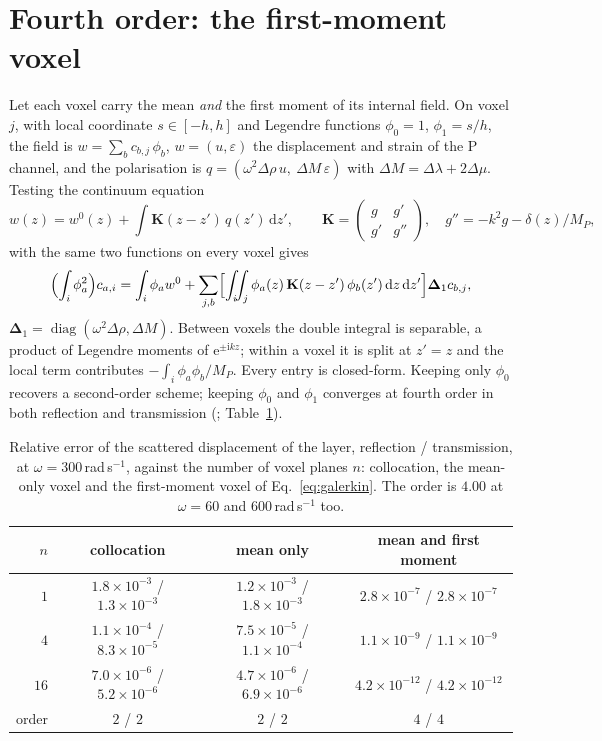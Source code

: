 \documentclass[extra,mreferee]{gji}
\newcommand{\bK}{\mathbf{K}}
\newcommand{\bD}{\boldsymbol{\Delta}}
\begin{document}
\section{Fourth order: the first-moment voxel}\label{sec:fourth}

Let each voxel carry the mean \emph{and} the first moment of its internal field. On voxel $j$, with
local coordinate $s\in[-h,h]$ and Legendre functions $\phi_0=1$, $\phi_1=s/h$, the field is
$w=\sum_{b}c_{b,j}\,\phi_b$, $w=(u,\varepsilon)$ the displacement and strain of the P channel, and
the polarisation is $q=(\omega^2\Delta\rho\,u,\ \Delta M\,\varepsilon)$ with $\Delta M=\Delta\lambda
+2\Delta\mu$. Testing the continuum equation
\begin{equation}
  w(z)=w^0(z)+\int\bK(z-z')\,q(z')\,\mathrm{d}z',\qquad
  \bK=\begin{pmatrix} g & g' \\ g' & g''\end{pmatrix},\quad g''=-k^2g-\delta(z)/M_P,
\end{equation}
with the same two functions on every voxel gives
\begin{equation}\label{eq:galerkin}
  \Bigl(\int_{i}\phi_a^2\Bigr)c_{a,i}
  =\int_i\phi_a w^0+\sum_{j,b}\Bigl[\int_i\!\!\int_j\phi_a(z)\,\bK(z-z')\,\phi_b(z')\,\mathrm{d}z\,\mathrm{d}z'\Bigr]
  \bD_1 c_{b,j},
\end{equation}
$\bD_1=\operatorname{diag}(\omega^2\Delta\rho,\Delta M)$. Between voxels the double integral is
separable, a product of Legendre moments of $\mathrm{e}^{\pm \mathrm{i}kz}$; within a voxel it is split at $z'=z$ and
the local term contributes $-\int_i\phi_a\phi_b/M_P$. Every entry is closed-form. Keeping only
$\phi_0$ recovers a second-order scheme; keeping $\phi_0$ and $\phi_1$ converges at fourth order in
both reflection and transmission (; Table~\ref{tab:fourth1d}).
\begin{table}
\centering
\caption{Relative error of the scattered displacement of the layer, reflection / transmission, at $\omega=300$\,rad\,s$^{-1}$, against the number of voxel planes $n$: collocation, the mean-only voxel and the first-moment voxel of Eq.~\eqref{eq:galerkin}. The order is $4.00$ at $\omega=60$ and $600$\,rad\,s$^{-1}$ too.}\label{tab:fourth1d}
\begin{tabular}{@{}rccc@{}}
\toprule
$n$ & collocation & mean only & mean and first moment \\
\midrule
$1$  & $1.8\times10^{-3}$ / $1.3\times10^{-3}$ & $1.2\times10^{-3}$ / $1.8\times10^{-3}$ &
       $2.8\times10^{-7}$ / $2.8\times10^{-7}$ \\
$4$  & $1.1\times10^{-4}$ / $8.3\times10^{-5}$ & $7.5\times10^{-5}$ / $1.1\times10^{-4}$ &
       $1.1\times10^{-9}$ / $1.1\times10^{-9}$ \\
$16$ & $7.0\times10^{-6}$ / $5.2\times10^{-6}$ & $4.7\times10^{-6}$ / $6.9\times10^{-6}$ &
       $4.2\times10^{-12}$ / $4.2\times10^{-12}$ \\
order & $2$ / $2$ & $2$ / $2$ & $4$ / $4$ \\
\bottomrule
\end{tabular}
\end{table}
\end{document}
